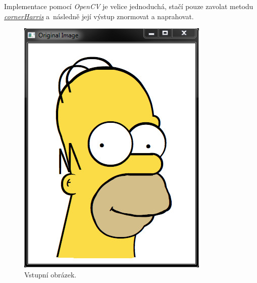 \documentclass[12pt, a4paper]{article}
\begin{document}
\newpage

\par{Implementace pomocí \textit{OpenCV} je velice jednoduchá, stačí pouze zavolat metodu \href{http://docs.opencv.org/modules/imgproc/doc/feature_detection.html?highlight=cornerharris#cv2.cornerHarris}{\textit{cornerHarris}} a~následně její výstup znormovat a naprahovat.

\begin{figure}[!ht]
	\centering
	\begin{minipage}[t]{0.49\textwidth}
		\includegraphics[width = \textwidth]{OriginalImg.png}
		\caption{Vstupní obrázek.}
		\label{fig:OriginalImg}
	\end{minipage}%
	\hfill
	\begin{minipage}[t]{0.49\textwidth}

\end{minipage}
\end{figure}}
\end{document}
